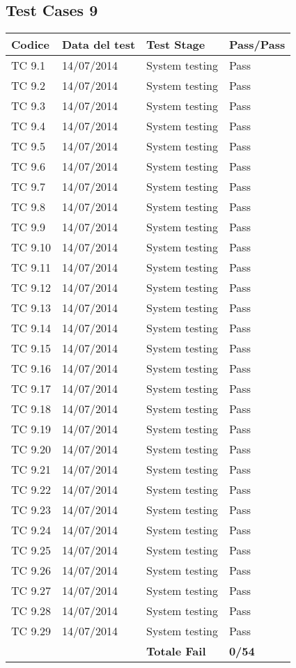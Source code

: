 \subsection{Test Cases 9}

\begin{longtable}{|p{3cm}|p{3cm}|p{3cm}|p{3cm}|}
	\hline
	\rowcolor{Gray}
	\textbf{Codice} & \textbf{Data del test} & \textbf{Test Stage} & \textbf{Pass/Pass}\tabularnewline
	\hline
	TC 9.1			& 14/07/2014 			& System testing		& Pass \tabularnewline
	\hline
	TC 9.2			& 14/07/2014 			& System testing		& Pass \tabularnewline
	\hline
	TC 9.3			& 14/07/2014 			& System testing		& Pass \tabularnewline
	\hline
	TC 9.4			& 14/07/2014 			& System testing		& Pass \tabularnewline
	\hline
	TC 9.5			& 14/07/2014 			& System testing		& Pass \tabularnewline
	\hline
	TC 9.6			& 14/07/2014 			& System testing		& Pass \tabularnewline
	\hline
	TC 9.7			& 14/07/2014 			& System testing		& Pass \tabularnewline
	\hline
	TC 9.8			& 14/07/2014 			& System testing		& Pass \tabularnewline
	\hline
	TC 9.9			& 14/07/2014 			& System testing		& Pass \tabularnewline
	\hline
	TC 9.10			& 14/07/2014 			& System testing		& Pass \tabularnewline
	\hline
	TC 9.11			& 14/07/2014 			& System testing		& Pass \tabularnewline
	\hline
	TC 9.12			& 14/07/2014 			& System testing		& Pass \tabularnewline
	\hline
	TC 9.13			& 14/07/2014 			& System testing		& Pass \tabularnewline
	\hline
	TC 9.14			& 14/07/2014 			& System testing		& Pass \tabularnewline
	\hline
	TC 9.15			& 14/07/2014 			& System testing		& Pass \tabularnewline
	\hline
	TC 9.16			& 14/07/2014 			& System testing		& Pass \tabularnewline
	\hline
	TC 9.17			& 14/07/2014 			& System testing		& Pass \tabularnewline
	\hline
	TC 9.18			& 14/07/2014 			& System testing		& Pass \tabularnewline
	\hline
	TC 9.19			& 14/07/2014 			& System testing		& Pass \tabularnewline
	\hline
	TC 9.20			& 14/07/2014 			& System testing		& Pass \tabularnewline
	\hline
	TC 9.21			& 14/07/2014 			& System testing		& Pass \tabularnewline
	\hline
	TC 9.22			& 14/07/2014 			& System testing		& Pass \tabularnewline
	\hline
	TC 9.23			& 14/07/2014 			& System testing		& Pass \tabularnewline
	\hline
	TC 9.24			& 14/07/2014 			& System testing		& Pass \tabularnewline
	\hline
	TC 9.25			& 14/07/2014 			& System testing		& Pass \tabularnewline
	\hline
	TC 9.26			& 14/07/2014 			& System testing		& Pass \tabularnewline
	\hline
	TC 9.27			& 14/07/2014 			& System testing		& Pass \tabularnewline
	\hline
	TC 9.28			& 14/07/2014 			& System testing		& Pass \tabularnewline
	\hline
	TC 9.29			& 14/07/2014 			& System testing		& Pass \tabularnewline
	\hline
					& 						& \textbf{Totale Fail}	& \textbf{0/54} \tabularnewline
	\hline
\end{longtable}

